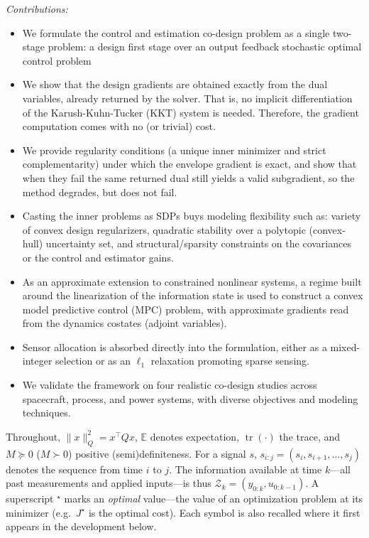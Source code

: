 \documentclass[twocolumn,amsthm]{autart}
\begin{document}
\emph{Contributions:}
\begin{itemize}
    \item We formulate the control and estimation co-design problem as a single two-stage problem: a design first stage over an output feedback stochastic optimal control problem
    \item We show that the design gradients are obtained exactly from the dual variables, already returned by the solver. That is, no implicit differentiation of the Karush-Kuhn-Tucker (KKT) system is needed. Therefore, the gradient computation comes with no (or trivial) cost.
    \item We provide regularity conditions (a unique inner minimizer and strict complementarity) under which the envelope gradient is exact, and show that when they fail the same returned dual still yields a valid subgradient, so the method degrades, but does not fail.
    \item Casting the inner problems as SDPs buys modeling flexibility such as: variety of convex design regularizers, quadratic stability over a polytopic (convex-hull) uncertainty set, and structural/sparsity constraints on the covariances or the control and estimator gains.
    \item As an approximate extension to constrained nonlinear systems, a regime built around the linearization of the information state is used to construct a convex model predictive control (MPC) problem, with approximate gradients read from the
    dynamics costates (adjoint variables).
    \item Sensor allocation is absorbed directly into the formulation, either as a mixed-integer selection or as an $\ell_1$ relaxation promoting sparse sensing.
    \item We validate the framework on four realistic co-design studies across spacecraft, process, and power systems, with diverse objectives and modeling techniques.
\end{itemize}

Throughout, $\| x \|_Q^2 = x^\top Q x$, $\mathbb{E}$ denotes expectation,
$\operatorname{tr}(\cdot)$ the trace, and $M \succeq 0$ ($M \succ 0$) positive
(semi)definiteness. For a signal $s$, $s_{i:j} = (s_i, s_{i+1}, \dots, s_j)$ denotes
the sequence from time $i$ to $j$. The information available at time $k$---all past
measurements and applied inputs---is thus $\mathcal{Z}_k = (y_{0:k}, u_{0:k-1})$.
A superscript ${}^\star$ marks an \emph{optimal} value---the value of an
optimization problem at its minimizer (e.g.\ $J^\star$ is the optimal cost).
Each symbol is also recalled where it first appears in the development below.
\end{document}
